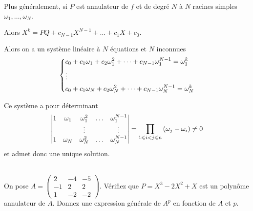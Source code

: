 \begin{rem}
Plus généralement, si \(P\) est annulateur de \(f\) et de degré \(N\) à \(N\) racines simples \(\omega_1,\dots,\omega_N\).

Alors \(X^k=PQ+c_{N-1}X^{N-1}+\dots+c_1X+c_0\).

Alors on a un système linéaire à \(N\) équations et \(N\) inconnues \[\begin{dcases}
c_0+c_1\omega_1+c_2\omega_1^2+\dots+c_{N-1}\omega_1^{N-1}=\omega_1^k \\
\vdots \\
c_0+c_1\omega_N+c_2\omega_N^2+\dots+c_{N-1}\omega_N^{N-1}=\omega_N^k
\end{dcases}\]

Ce système a pour déterminant \[\begin{vmatrix}
1 & \omega_1 & \omega_1^2 & \dots & \omega_1^{N-1} \\
 & & \vdots & & \vdots \\
1 & \omega_N & \omega_N^2 & \dots & \omega_N^{N-1}
\end{vmatrix}=\prod_{1\leqslant i<j\leqslant n}\left(\omega_j-\omega_i\right)\not=0\] et admet donc une unique solution.
\end{rem}

\begin{exo}~\\
On pose \(A=\begin{pmatrix}
2 & -4 & -5 \\
-1 & 2 & 2 \\
1 & -2 & -2
\end{pmatrix}\). Vérifiez que \(P=X^3-2X^2+X\) est un polynôme annulateur de \(A\). Donnez une expression générale de \(A^p\) en fonction de \(A\) et \(p\).
\end{exo}

